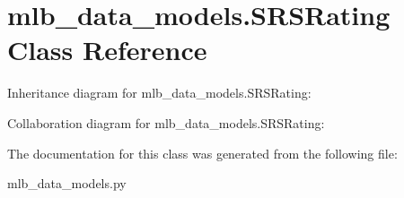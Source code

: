 \hypertarget{classmlb__data__models_1_1SRSRating}{}\section{mlb\+\_\+data\+\_\+models.\+S\+R\+S\+Rating Class Reference}
\label{classmlb__data__models_1_1SRSRating}


Inheritance diagram for mlb\+\_\+data\+\_\+models.\+S\+R\+S\+Rating\+:


Collaboration diagram for mlb\+\_\+data\+\_\+models.\+S\+R\+S\+Rating\+:


The documentation for this class was generated from the following file\+:\begin{DoxyCompactItemize}
\item 
mlb\+\_\+data\+\_\+models.\+py\end{DoxyCompactItemize}
